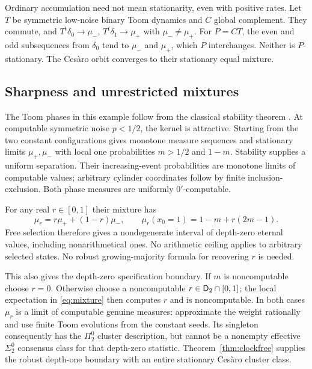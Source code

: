 Ordinary accumulation need not mean stationarity, even with
positive rates. Let $T$ be symmetric low-noise binary Toom
dynamics and $C$ global complement. They commute, and
$T^t\delta_0\to\mu_-$, $T^t\delta_1\to\mu_+$ with
$\mu_-\ne\mu_+$. For $P=CT$, the even and odd subsequences
from $\delta_0$ tend to $\mu_-$ and $\mu_+$, which $P$
interchanges. Neither is $P$-stationary. The Ces\`aro orbit
converges to their stationary equal mixture.

\subsection{Sharpness and unrestricted mixtures}
The Toom phases in this example follow from the classical
stability theorem \cite{toom,gacstoom}. At computable symmetric
noise $p<1/2$, the kernel is attractive. Starting from the two
constant configurations gives monotone measure sequences and
stationary limits $\mu_+,\mu_-$ with local one probabilities
$m>1/2$ and $1-m$. Stability supplies a uniform separation.
Their increasing-event probabilities are monotone limits of
computable values; arbitrary cylinder coordinates follow by
finite inclusion-exclusion. Both phase measures are uniformly
$0'$-computable.

For any real $r\in[0,1]$ their mixture has
\begin{equation}\label{eq:mixture}
 \mu_r=r\mu_++(1-r)\mu_-,\qquad
 \mu_r(x_0=1)=1-m+r(2m-1).
\end{equation}
Free selection therefore gives a nondegenerate interval of
depth-zero eternal values, including nonarithmetical ones.
No arithmetic ceiling applies to arbitrary selected states.
No robust growing-majority formula for recovering $r$ is needed.

This also gives the depth-zero specification boundary. If $m$
is noncomputable choose $r=0$. Otherwise choose a noncomputable
$r\in\mathsf D_2\cap[0,1]$; the local expectation in \eqref{eq:mixture}
then computes $r$ and is noncomputable. In both cases $\mu_r$
is a limit of computable genuine measures: approximate the
weight rationally and use finite Toom evolutions from the
constant seeds. Its singleton consequently has the $\Pi^0_2$
cluster description, but cannot be a nonempty effective
$\Sigma^0_2$ consensus class for that depth-zero statistic.
Theorem~\ref{thm:clockfree} supplies the robust depth-one
boundary with an entire stationary Ces\`aro cluster class.

